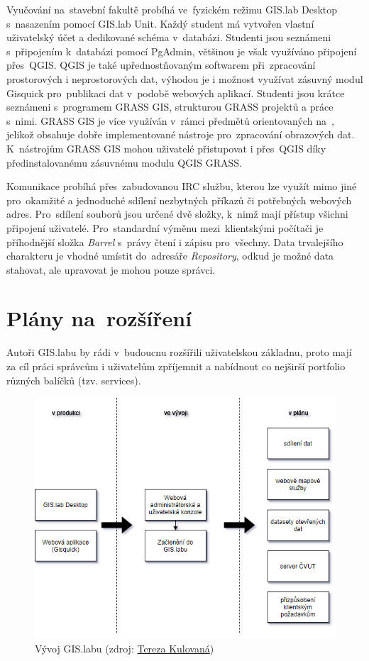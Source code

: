 Vyučování na~stavební fakultě probíhá ve~fyzickém režimu GIS.lab Desktop s~nasazením
pomocí GIS.lab Unit. Každý student má vytvořen vlastní uživatelský
účet a dedikované schéma v~databázi. Studenti jsou seznámeni s~připojením 
k~databázi pomocí PgAdmin, většinou je však využíváno
připojení přes~QGIS. QGIS je také upřednostňovaným softwarem při~zpracování 
prostorových i neprostorových dat, výhodou je i možnost
využívat zásuvný modul Gisquick pro~publikaci dat v~podobě webových
aplikací. Studenti jsou krátce seznámeni s~programem GRASS GIS,
strukturou GRASS projektů a práce s~nimi. GRASS GIS je více využíván v~rámci 
předmětů orientovaných na~, jelikož obsahuje dobře
implementované nástroje pro~zpracování obrazových dat. K~nástrojům
GRASS GIS mohou uživatelé přistupovat i přes~QGIS  díky
předinstalovanému zásuvnému modulu QGIS GRASS.

Komunikace probíhá přes~zabudovanou IRC službu, kterou lze využít mimo
jiné pro~okamžité a jednoduché sdílení nezbytných příkazů či
potřebných webových adres. Pro~sdílení souborů jsou určené dvě složky,
k~nimž mají přístup všichni připojení uživatelé. Pro~standardní výměnu
mezi~klientskými počítači je příhodnější složka \textit{Barrel} s~právy 
čtení i zápisu pro~všechny. Data trvalejšího charakteru je
vhodné umístit do~adresáře \textit{Repository}, odkud je možné data
stahovat, ale upravovat je mohou pouze správci.

\section{Plány na~rozšíření}
\label{vision}

Autoři GIS.labu by rádi v~budoucnu rozšířili uživatelskou základnu,
proto mají za cíl práci správcům i uživatelům zpříjemnit a nabídnout
co nejširší portfolio různých balíčků (tzv. services). 

\begin{figure}[H] \centering
    \includegraphics[width=350pt]{./pictures/gislab_road_map_02.png}
    \caption[Vývoj GIS.labu]{Vývoj GIS.labu (zdroj:
	\href{}{Tereza Kulovaná})}
    \label{fig:gislab-roadmap}
\end{figure}

